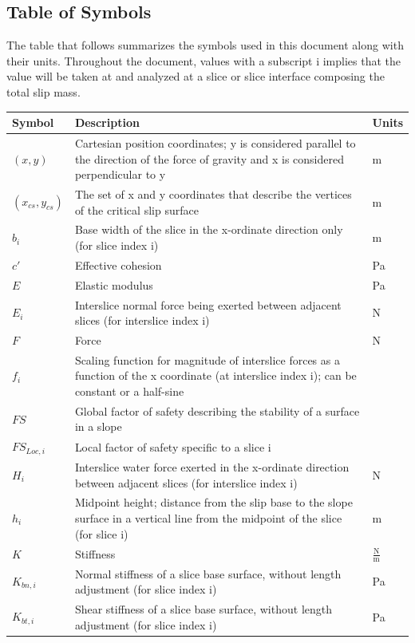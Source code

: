 \documentclass[12pt]{article}
\begin{document}
\subsection{Table of Symbols}
\label{Sec:TablofSymb}
The table that follows summarizes the symbols used in this document along with their units. Throughout the document, values with a subscript i implies that the value will be taken at and analyzed at a slice or slice interface composing the total slip mass.
\begin{longtable*}{l l l}
\toprule
Symbol & Description & Units
\\
\midrule
$(x,y)$ & Cartesian position coordinates; y is considered parallel to the direction of the force of gravity and x is considered perpendicular to y & m
\\
$({x_{cs}},{y_{cs}})$ & The set of x and y coordinates that describe the vertices of the critical slip surface & m
\\
$b_{i}$ & Base width of the slice in the x-ordinate direction only (for slice index i) & m
\\
$c'$ & Effective cohesion & Pa
\\
$E$ & Elastic modulus & Pa
\\
$E_{i}$ & Interslice normal force being exerted between adjacent slices (for interslice index i) & N
\\
$F$ & Force & N
\\
$f_{i}$ & Scaling function for magnitude of interslice forces as a function of the x coordinate (at interslice index i); can be constant or a half-sine & 
\\
$FS$ & Global factor of safety describing the stability of a surface in a slope & 
\\
$FS_{Loc,i}$ & Local factor of safety specific to a slice i & 
\\
$H_{i}$ & Interslice water force exerted in the x-ordinate direction between adjacent slices (for interslice index i) & N
\\
$h_{i}$ & Midpoint height; distance from the slip base to the slope surface in a vertical line from the midpoint of the slice (for slice i) & m
\\
$K$ & Stiffness & $\frac{\text{N}}{\text{m}}$
\\
$K_{bn,i}$ & Normal stiffness of a slice base surface, without length adjustment (for slice index i) & Pa
\\
$K_{bt,i}$ & Shear stiffness of a slice base surface, without length adjustment (for slice index i) & Pa
\\

\end{longtable*}
\end{document}
